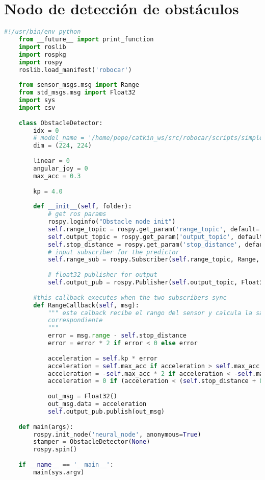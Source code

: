 \section{Nodo de detección de obstáculos}
\begin{lstlisting}[title={obstacle\_node.py},language=Python]
    #!/usr/bin/env python
    from __future__ import print_function
    import roslib
    import rospkg
    import rospy
    roslib.load_manifest('robocar')
    
    from sensor_msgs.msg import Range
    from std_msgs.msg import Float32
    import sys
    import csv
    
    class ObstacleDetector:
        idx = 0
        # model_name = '/home/pepe/catkin_ws/src/robocar/scripts/simple2'
        dim = (224, 224)
    
        linear = 0
        angular_joy = 0
        max_acc = 0.3
    
        kp = 4.0
    
        def __init__(self, folder):
            # get ros params
            rospy.loginfo("Obstacle node init")
            self.range_topic = rospy.get_param('range_topic', default='/laser')
            self.output_topic = rospy.get_param('output_topic', default='/obstacle_output')
            self.stop_distance = rospy.get_param('stop_distance', default=0.15)
            # input subscriber for the predictor
            self.range_sub = rospy.Subscriber(self.range_topic, Range, self.RangeCallback, queue_size=1)
            
            # float32 publisher for output 
            self.output_pub = rospy.Publisher(self.output_topic, Float32, queue_size=1)
        
        #this callback executes when the two subscribers sync
        def RangeCallback(self, msg):
            """ este calback recibe el rango del sensor y calcula la salida 
            correspondiente
            """
            error = msg.range - self.stop_distance
            error = error * 2 if error < 0 else error 
            
            acceleration = self.kp * error
            acceleration = self.max_acc if acceleration > self.max_acc else acceleration
            acceleration = -self.max_acc * 2 if acceleration < -self.max_acc else acceleration
            acceleration = 0 if (acceleration < (self.stop_distance + 0.03)) and (acceleration > (self.stop_distance - 0.01)) else acceleration
    
            out_msg = Float32()
            out_msg.data = acceleration
            self.output_pub.publish(out_msg)
        
    def main(args):
        rospy.init_node('neural_node', anonymous=True)
        stamper = ObstacleDetector(None)
        rospy.spin()
       
    if __name__ == '__main__':
        main(sys.argv)
    
\end{lstlisting}

